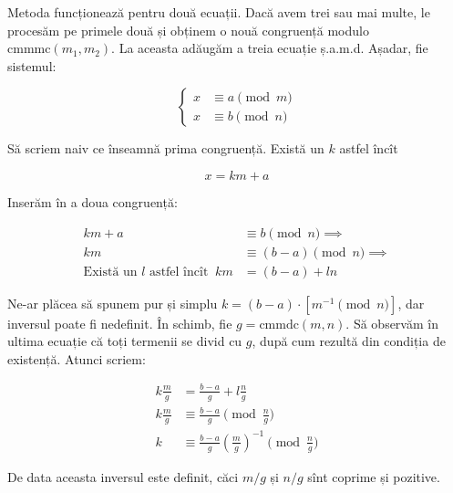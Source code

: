\documentclass[../main.tex]{subfiles}
\begin{document}
Metoda funcționează pentru două ecuații. Dacă avem trei sau mai multe, le procesăm pe primele două și obținem o nouă congruență modulo $\text{cmmmc}(m_1, m_2)$. La aceasta adăugăm a treia ecuație ș.a.m.d. Așadar, fie sistemul:

$$
\begin{cases}
x &\equiv a \pmod{m}\\
x &\equiv b \pmod{n}
\end{cases}
$$

Să scriem naiv ce înseamnă prima congruență. Există un $k$ astfel încît

$$x = km + a$$

Inserăm în a doua congruență:

$$
\begin{aligned}
km + a & \equiv b \pmod{n} \implies \\
km & \equiv (b-a) \pmod{n} \implies \\
\text{Există un $l$ astfel încît }\ km &= (b-a) + ln
\end{aligned}
$$

Ne-ar plăcea să spunem pur și simplu $k=(b-a) \cdot [m^{-1} \pmod{n}]$, dar inversul poate fi nedefinit. În schimb, fie $g = \text{cmmdc}(m, n)$. Să observăm în ultima ecuație că toți termenii se divid cu $g$, după cum rezultă din condiția de existență. Atunci scriem:

$$
\begin{aligned}
k \frac{m}{g} & = \frac{b-a}{g} + l \frac{n}{g} \\
k \frac{m}{g} & \equiv \frac{b-a}{g} \pmod{\frac{n}{g}} \\
k & \equiv \frac{b-a}{g} \left(\frac{m}{g}\right)^{-1} \pmod{\frac{n}{g}}
\end{aligned}
$$

De data aceasta inversul este definit, căci $m/g$ și $n/g$ sînt coprime și pozitive.
\end{document}
